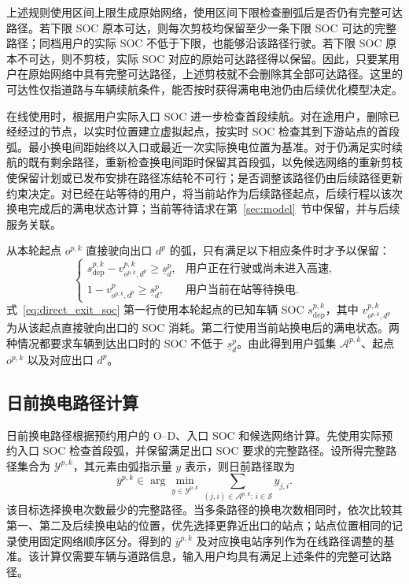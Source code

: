上述规则使用区间上限生成原始网络，使用区间下限检查删弧后是否仍有完整可达路径。若下限 SOC 原本可达，则每次剪枝均保留至少一条下限 SOC 可达的完整路径；同档用户的实际 SOC 不低于下限，也能够沿该路径行驶。若下限 SOC 原本不可达，则不剪枝，实际 SOC 对应的原始可达路径得以保留。因此，只要某用户在原始网络中具有完整可达路径，上述剪枝就不会删除其全部可达路径。这里的可达性仅指道路与车辆续航条件，能否按时获得满电电池仍由后续优化模型决定。

在线使用时，根据用户实际入口 SOC 进一步检查首段续航。对在途用户，删除已经经过的节点，以实时位置建立虚拟起点，按实时 SOC 检查其到下游站点的首段弧。最小换电间距始终以入口或最近一次实际换电位置为基准。对于仍满足实时续航的既有剩余路径，重新检查换电间距时保留其首段弧，以免候选网络的重新剪枝使保留计划或已发布安排在路径冻结轮不可行；是否调整该路径仍由后续路径更新约束决定。对已经在站等待的用户，将当前站作为后续路径起点，后续行程以该次换电完成后的满电状态计算；当前等待请求在第~\ref{sec:model}~节中保留，并与后续服务关联。

从本轮起点 $o^{p,k}$ 直接驶向出口 $d^p$ 的弧，只有满足以下相应条件时才予以保留：
\begin{equation}
\begin{cases}
s_{\mathrm{dep}}^{p,k}-v_{o^{p,k},d^p}^{p,k}\ge\underline s_d^p,
&\text{用户正在行驶或尚未进入高速},\\
1-v_{o^{p,k},d^p}^{p}\ge\underline s_d^p,
&\text{用户当前在站等待换电}.
\end{cases}
\label{eq:direct_exit_soc}
\end{equation}
式~\eqref{eq:direct_exit_soc} 第一行使用本轮起点的已知车辆 SOC $s_{\mathrm{dep}}^{p,k}$，其中 $v_{o^{p,k},d^p}^{p,k}$ 为从该起点直接驶向出口的 SOC 消耗。第二行使用当前站换电后的满电状态。两种情况都要求车辆到达出口时的 SOC 不低于 $\underline s_d^p$。由此得到用户弧集 $\mathcal A^{p,k}$、起点 $o^{p,k}$ 以及对应出口 $d^p$。

\subsection{日前换电路径计算}
\label{sec:dayahead}
日前换电路径根据预约用户的 O--D、入口 SOC 和候选网络计算。先使用实际预约入口 SOC 检查首段弧，并保留满足出口 SOC 要求的完整路径。设所得完整路径集合为 $\mathcal Y^{p,k}$，其元素由弧指示量 $y$ 表示，则日前路径取为
\begin{equation}
\bar y^{p,k}\in\arg\min_{y\in\mathcal Y^{p,k}}
\sum_{(j,i)\in\mathcal A^{p,k}:\,i\in\mathcal S}y_{j,i}.
\label{eq:dayahead_path}
\end{equation}
该目标选择换电次数最少的完整路径。当多条路径的换电次数相同时，依次比较其第一、第二及后续换电站的位置，优先选择更靠近出口的站点；站点位置相同的记录使用固定网络顺序区分。得到的 $\bar y^{p,k}$ 及对应换电站序列作为在线路径调整的基准。该计算仅需要车辆与道路信息，输入用户均具有满足上述条件的完整可达路径。

